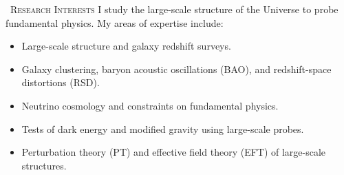 \prefixmarker{}
\begin{rubric}{\faStar\ \textsc{Research Interests}}
\entry*[]%
I study the large-scale structure of the Universe to probe fundamental physics. My areas of expertise include: \par
\begin{multicols}{2}
\begin{itemize}
	\item Large-scale structure and galaxy redshift surveys.
	\item Galaxy clustering, baryon acoustic oscillations (BAO), and redshift-space distortions (RSD).
	\item Neutrino cosmology and constraints on fundamental physics.
	\item Tests of dark energy and modified gravity using large-scale probes.
	\item Perturbation theory (PT) and effective field theory (EFT) of large-scale structures.
\end{itemize}
\end{multicols}\par
\end{rubric}
